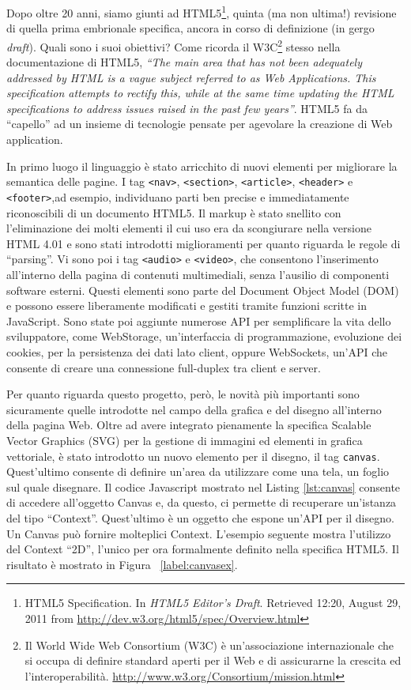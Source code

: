 Dopo oltre 20 anni, siamo giunti ad HTML5\footnote{HTML5 Specification. In \textit{HTML5 Editor's Draft}. Retrieved 12:20, August 29, 2011 from \url{http://dev.w3.org/html5/spec/Overview.html}}, quinta (ma non ultima!) revisione di quella prima embrionale specifica, ancora in corso di definizione (in gergo \textit{draft}). Quali sono i suoi obiettivi? Come ricorda il W3C\footnote{Il World Wide Web Consortium (W3C) è un'associazione internazionale che si occupa di definire standard aperti per il Web e di assicurarne la crescita ed l'interoperabilità. \url{http://www.w3.org/Consortium/mission.html}} stesso nella documentazione di HTML5, \textit{“The main area that has not been adequately addressed by HTML is a vague subject referred to as Web Applications. This specification attempts to rectify this, while at the same time updating the HTML specifications to address issues raised in the past few years”}. HTML5 fa da “capello” ad un insieme di tecnologie pensate per agevolare la creazione di Web application.

In primo luogo il linguaggio è stato arricchito di nuovi elementi per migliorare la semantica delle pagine. I tag \texttt{<nav>}, \texttt{<section>}, \texttt{<article>}, \texttt{<header>} e \texttt{<footer>},ad esempio, individuano parti ben precise e immediatamente riconoscibili di un documento HTML5. Il markup è stato snellito con l'eliminazione dei molti elementi il cui uso era da scongiurare nella versione HTML 4.01 e sono stati introdotti miglioramenti per quanto riguarda le regole di ``parsing''. Vi sono poi i tag \texttt{<audio>} e \texttt{<video>}, che consentono l'inserimento all'interno della pagina di contenuti multimediali, senza l'ausilio di componenti software esterni. Questi elementi sono parte del Document Object Model (DOM) e possono essere liberamente modificati e gestiti tramite funzioni scritte in JavaScript. Sono state poi aggiunte numerose API per semplificare la vita dello sviluppatore, come WebStorage, un'interfaccia di programmazione, evoluzione dei cookies, per la persistenza dei dati lato client, oppure WebSockets, un'API che consente di creare una connessione full-duplex tra client e server. 

Per quanto riguarda questo progetto, però, le novità più importanti sono sicuramente quelle introdotte nel campo della grafica e del disegno all'interno della pagina Web. Oltre ad avere integrato pienamente la specifica Scalable Vector Graphics (SVG) per la gestione di immagini ed elementi in grafica vettoriale, è stato introdotto un nuovo elemento per il disegno, il tag \texttt{canvas}. Quest'ultimo consente di definire un'area da utilizzare come una tela, un foglio sul quale disegnare. Il codice Javascript mostrato nel Listing \ref{lst:canvas} consente di accedere all'oggetto Canvas e, da questo, ci permette di recuperare un'istanza del tipo ``Context''. Quest'ultimo è un oggetto che espone un'API per il disegno. Un Canvas può fornire molteplici Context. L'esempio seguente mostra l'utilizzo del Context ``2D'', l'unico per ora formalmente definito nella specifica HTML5. Il risultato è mostrato in Figura ~\ref{label:canvasex}.

